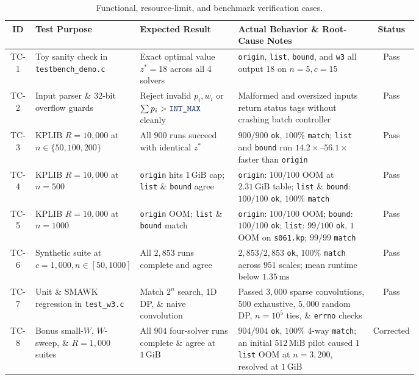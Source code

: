 \documentclass[10pt, a4paper]{article}
\newcommand{\code}[1]{\texttt{\color{primary!90!black}#1}}
\begin{document}
\vspace{-0.2em}
\begin{table}[H]
\centering
\caption{Functional, resource-limit, and benchmark verification cases.}
\label{tab:testcases}
\renewcommand{\arraystretch}{1.03}
\setlength{\tabcolsep}{3.2pt}
\footnotesize
\begin{tabular}{@{}c
  >{\raggedright\arraybackslash}p{0.21\linewidth}
  >{\raggedright\arraybackslash}p{0.24\linewidth}
  >{\raggedright\arraybackslash}p{0.33\linewidth}
  c@{}}
\toprule
\textbf{\color{primary}ID} & \textbf{\color{primary}Test Purpose} & \textbf{\color{primary}Expected Result} & \textbf{\color{primary}Actual Behavior \& Root-Cause Notes} & \textbf{\color{primary}Status} \\
\midrule
TC-1 & Toy sanity check in \code{testbench\_demo.c} & Exact optimal value $z^* = 18$ across all 4 solvers & \code{origin}, \code{list}, \code{bound}, and \code{w3} all output $18$ on $n = 5, c = 15$ & Pass \\
TC-2 & Input parser \& 32-bit overflow guards & Reject invalid $p_i, w_i$ or $\sum p_i > \code{INT\_MAX}$ cleanly & Malformed and oversized inputs return status tags without crashing batch controller & Pass \\
TC-3 & KPLIB $R = 10{,}000$ at $n \in \{50, 100, 200\}$ & All $900$ runs succeed with identical $z^*$ & $900/900$ \code{ok}, $100\%$ \code{match}; \code{list} and \code{bound} run $14.2\times$--$56.1\times$ faster than \code{origin} & Pass \\
TC-4 & KPLIB $R = 10{,}000$ at $n = 500$ & \code{origin} hits $1\,\text{GiB}$ cap; \code{list} \& \code{bound} agree & \code{origin}: $100/100$ OOM at $2.31\,\text{GiB}$ table; \code{list} \& \code{bound}: $100/100$ \code{ok}, $100\%$ \code{match} & Pass \\
TC-5 & KPLIB $R = 10{,}000$ at $n = 1000$ & \code{origin} OOM; \code{list} \& \code{bound} match & \code{origin}: $100/100$ OOM; \code{bound}: $100/100$ \code{ok}; \code{list}: $99/100$ \code{ok}, $1$ OOM on \code{s061.kp}; $99/99$ \code{match} & Pass \\
TC-6 & Synthetic suite at $c = 1{,}000, n \in [50, 1000]$ & All $2{,}853$ runs complete and agree & $2{,}853/2{,}853$ \code{ok}, $100\%$ \code{match} across $951$ scales; mean runtime below $1.35\,\text{ms}$ & Pass \\
TC-7 & Unit \& SMAWK regression in \code{test\_w3.c} & Match $2^n$ search, 1D DP, \& naive convolution & Passed $3{,}000$ sparse convolutions, $500$ exhaustive, $5{,}000$ random DP, $n = 10^5$ ties, \& \code{errno} checks & Pass \\
TC-8 & Bonus small-$W$, $W$-sweep, \& $R = 1{,}000$ suites & All $904$ four-solver runs complete \& agree at $1\,\text{GiB}$ & $904/904$ \code{ok}, $100\%$ 4-way \code{match}; an initial $512\,\text{MiB}$ pilot caused $1$ \code{list} OOM at $n = 3{,}200$, resolved at $1\,\text{GiB}$ & Corrected \\
\bottomrule
\end{tabular}
\end{table}
\vspace{-0.3em}
\end{document}
